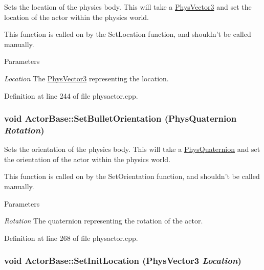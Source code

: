 Sets the location of the physics body. This will take a \hyperlink{classPhysVector3}{PhysVector3} and set the location of the actor within the physics world. \par
 This function is called on by the SetLocation function, and shouldn't be called manually. 
\begin{DoxyParams}{Parameters}
\item[{\em Location}]The \hyperlink{classPhysVector3}{PhysVector3} representing the location. \end{DoxyParams}


Definition at line 244 of file physactor.cpp.\hypertarget{classActorBase_adf817bd5a7c562f31f6724a06a3a0f79}{
\subsubsection[{SetBulletOrientation}]{\setlength{\rightskip}{0pt plus 5cm}void ActorBase::SetBulletOrientation ({\bf PhysQuaternion} {\em Rotation})}}
\label{dd/d7b/classActorBase_adf817bd5a7c562f31f6724a06a3a0f79}


Sets the orientation of the physics body. This will take a \hyperlink{classPhysQuaternion}{PhysQuaternion} and set the orientation of the actor within the physics world. \par
 This function is called on by the SetOrientation function, and shouldn't be called manually. 
\begin{DoxyParams}{Parameters}
\item[{\em Rotation}]The quaternion representing the rotation of the actor. \end{DoxyParams}


Definition at line 268 of file physactor.cpp.\hypertarget{classActorBase_ac118fc21f89d067d987d511b444f7d55}{
\subsubsection[{SetInitLocation}]{\setlength{\rightskip}{0pt plus 5cm}void ActorBase::SetInitLocation ({\bf PhysVector3} {\em Location})}}
\label{dd/d7b/classActorBase_ac118fc21f89d067d987d511b444f7d55}


